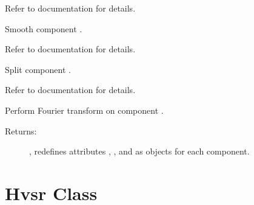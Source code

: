 \documentclass[letterpaper,10pt,english,openany,oneside]{sphinxmanual}
\begin{document}
\begin{fulllineitems}
\begin{fulllineitems}
Refer to  documentation for details.

\end{fulllineitems}


\begin{fulllineitems}
\label{\detokenize{index:hvsrpy.Sensor3c.smooth}}
Smooth component .

Refer to  documentation for details.

\end{fulllineitems}


\begin{fulllineitems}
\label{\detokenize{index:hvsrpy.Sensor3c.split}}
Split component .

Refer to  documentation for details.

\end{fulllineitems}


\begin{fulllineitems}
\label{\detokenize{index:hvsrpy.Sensor3c.transform}}
Perform Fourier transform on component .
\begin{description}
\item[{Returns:}] \leavevmode
{}, redefines attributes , , and  as 
 objects for each component.

\end{description}

\end{fulllineitems}


\end{fulllineitems}



\chapter{Hvsr Class}
\label{\detokenize{index:hvsr-class}}
\end{document}
